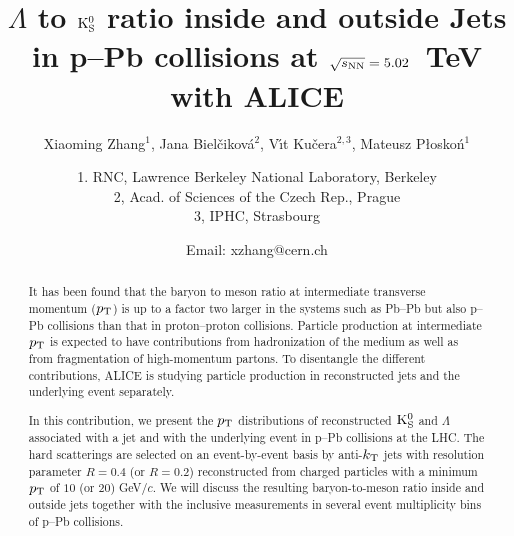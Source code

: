 \documentclass[ALICE,manyauthors]{LaTeX/ALICE_analysis_notes}
\begin{document}
\begin{titlepage}


\title{$\Lambda$ to ${\rm K}_{\rm S}^{0}$ ratio inside and outside Jets in p--Pb
       collisions at $\sqrt{s_{\rm NN}}=5.02$~TeV with ALICE}

\author{Xiaoming Zhang$^{1}$,
        Jana Biel\v{c}ikov\'a$^{2}$,
        V\'{\i}t Ku\v{c}era$^{2,3}$,
        Mateusz P{\l}osko\'n$^{1}$}
\author{
1. RNC, Lawrence Berkeley National Laboratory, Berkeley \\
2, Acad. of Sciences of the Czech Rep., Prague \\
3, IPHC, Strasbourg
}
\author{Email: xzhang@cern.ch}


\begin{abstract}

It has been found that the baryon to meson ratio at intermediate
transverse momentum ($p_{\rm T}$) is up to a factor two larger 
in the systems such as Pb--Pb but also p--Pb collisions than that
in proton--proton collisions.
Particle production at intermediate $p_{\rm T}$ is expected to have contributions
from hadronization of the medium as well as from fragmentation of high-momentum partons.
To disentangle the different contributions,
ALICE is studying particle production in reconstructed jets and the underlying event separately.

In this contribution,
we present the $p_{\rm T}$ distributions of reconstructed ${\rm K}_{\rm S}^{0}$
and $\Lambda$ associated with a jet and with the underlying event in p--Pb
collisions at the LHC.
The hard scatterings are selected on an event-by-event basis by
anti-$k_{\rm T}$ jets with resolution parameter $R=0.4$ (or $R=0.2$)
reconstructed from charged particles with a
minimum $p_{\rm T}$ of $10$ (or $20$) GeV/$c$.
We will discuss the resulting baryon-to-meson ratio inside and outside
jets together with the inclusive measurements in several event multiplicity
bins of p--Pb collisions.
\end{abstract}

\end{titlepage}

\tableofcontents

\newpage








\newpage
\clearpage
\appendix

\newpage
\clearpage


\newpage
\clearpage


\end{document}
